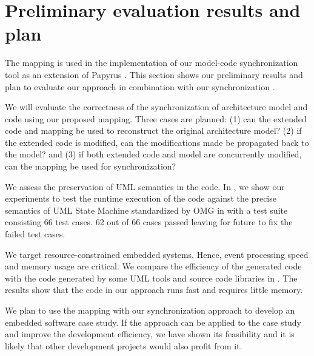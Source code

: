 \section{Preliminary evaluation results and plan}
\label{sec:evaluationplan}
The mapping is used in the implementation of our model-code synchronization tool \cite{foster2016} as an extension of Papyrus \cite{gerard201019}.
This section shows our preliminary results and plan to evaluate our approach in combination with our synchronization \cite{foster2016}.

\noindent
{}
We will evaluate the correctness of the synchronization of architecture model and code using our proposed mapping.
Three cases are planned: (1) can the extended code and mapping be used to reconstruct the original architecture model? (2) if the extended code is modified, can the modifications made be propagated back to the model? and (3) if both extended code and model are concurrently modified, can the mapping be used for synchronization?

\noindent
{}
We assess the preservation of UML semantics in the code.
In \cite{fullusm}, we show our experiments to test the runtime execution of the code against the precise semantics of UML State Machine standardized by OMG in \cite{PSSM} with a test suite consisting 66 test cases.
62 out of 66 cases passed leaving for future to fix the failed test cases.


\noindent
{}
We target resource-constrained embedded systems.
Hence, event processing speed and memory usage are critical.
We compare the efficiency of the generated code with the code generated by some UML tools and source code libraries in \cite{fullusm}.
The results show that the code in our approach runs fast and requires little memory.

\noindent
{}
We plan to use the mapping with our synchronization approach to develop an embedded software case study.%
If the approach can be applied to the case study and improve the development efficiency, we have shown its feasibility and it is likely that other development projects would also profit from it.

	
